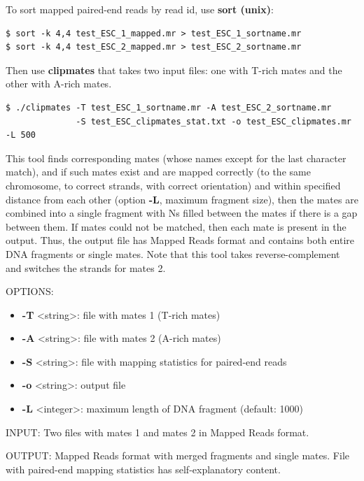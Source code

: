 \documentclass{article}
\begin{document}
To sort mapped paired-end reads by read id, use \textbf{sort (unix)}:
\begin{verbatim}
$ sort -k 4,4 test_ESC_1_mapped.mr > test_ESC_1_sortname.mr
$ sort -k 4,4 test_ESC_2_mapped.mr > test_ESC_2_sortname.mr
\end{verbatim}
\begin{flushleft}Then use \textbf{clipmates} that takes two input files: one
with T-rich mates and the other with A-rich mates.\end{flushleft}
\begin{verbatim}
$ ./clipmates -T test_ESC_1_sortname.mr -A test_ESC_2_sortname.mr
              -S test_ESC_clipmates_stat.txt -o test_ESC_clipmates.mr -L 500
\end{verbatim}
\begin{flushleft}This tool finds corresponding mates (whose names except for the last character
match), and if such mates exist and are mapped correctly (to the same chromosome, to
correct strands, with correct orientation) and within specified distance from each other
(option \textbf{-L}, maximum fragment size), then the mates are combined into 
a single fragment with Ns filled between the mates if there is a gap between them. If 
mates could not be matched, then each mate is present in the output. Thus, the output
file has Mapped Reads format and contains both entire DNA fragments or single mates.
Note that this tool takes reverse-complement and switches the strands for mates 2. \end{flushleft}

OPTIONS:
\begin{itemize}
\item
\textbf{-T} \textless string\textgreater : file with mates 1 (T-rich mates)
\item
\textbf{-A} \textless string\textgreater : file with mates 2 (A-rich mates)
\item
\textbf{-S} \textless string\textgreater : file with mapping statistics for paired-end reads
\item 
\textbf{-o} \textless string\textgreater : output file 
\item
\textbf{-L} \textless integer\textgreater : maximum length of DNA fragment (default: 1000)
\end{itemize}
 
INPUT: Two files with mates 1 and mates 2 in Mapped Reads format.

OUTPUT: Mapped Reads format with merged fragments and single mates. File with
paired-end mapping statistics has self-explanatory content.
 
\end{document}
